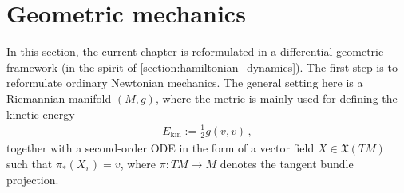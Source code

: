 \section{Geometric mechanics}

    In this section, the current chapter is reformulated in a differential geometric framework (in the spirit of \cref{section:hamiltonian_dynamics}). The first step is to reformulate ordinary Newtonian mechanics. The general setting here is a Riemannian manifold $(M,g)$, where the metric is mainly used for defining the kinetic energy
    \begin{gather}
        E_{\text{kin}} := \frac{1}{2}g(v,v)\,,
    \end{gather}
    together with a second-order ODE in the form of a vector field $X\in \mathfrak{X}(TM)$ such that $\pi_*(X_v)=v$, where $\pi:TM\rightarrow M$ denotes the tangent bundle projection.

